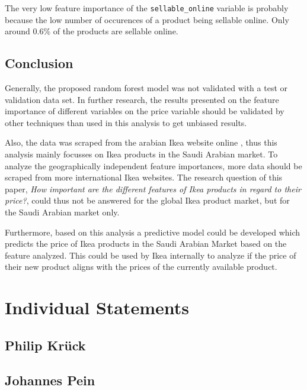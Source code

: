 \documentclass[a4paper, nobind]{templates/ociamthesis}
\begin{document}
The very low feature importance of the \texttt{sellable\_online} variable is probably because the low number of occurences of a product being sellable online. Only around 0.6\% of the products are sellable online.

\hypertarget{conclusion}{%
\section{Conclusion}\label{conclusion}}

Generally, the proposed random forest model was not validated with a test or validation data set. In further research, the results presented on the feature importance of different variables on the price variable should be validated by other techniques than used in this analysis to get unbiased results.

Also, the data was scraped from the arabian Ikea website online , thus this analysis mainly focusses on Ikea products in the Saudi Arabian market. To analyze the geographically independent feature importances, more data should be scraped from more international Ikea websites. The research question of this paper, \emph{How important are the different features of Ikea products in regard to their price?}, could thus not be answered for the global Ikea product market, but for the Saudi Arabian market only.

Furthermore, based on this analysis a predictive model could be developed which predicts the price of Ikea products in the Saudi Arabian Market based on the feature analyzed. This could be used by Ikea internally to analyze if the price of their new product aligns with the prices of the currently available product.

\hypertarget{individual-statements}{%
\chapter{Individual Statements}\label{individual-statements}}

\hypertarget{philip-kruxfcck}{%
\section{Philip Krück}\label{philip-kruxfcck}}

\hypertarget{johannes-pein}{%
\section{Johannes Pein}\label{johannes-pein}}
\end{document}
